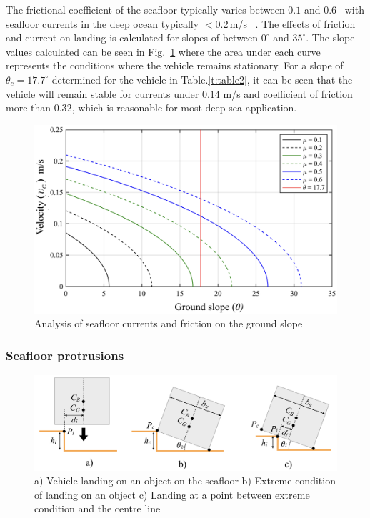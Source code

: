 \noindent The frictional coefficient of the seafloor typically varies between $0.1$ and $0.6$~\cite{DNV2017} with seafloor currents in the deep ocean typically $<0.2$\,m/s 
~\cite{Hollister1972}. The effects of friction and current on landing is calculated for slopes of between $0^\circ$ and $35^\circ$. The slope values calculated can be seen in Fig.~\ref{f:mehul10} where the area under each curve represents the conditions where the vehicle remains stationary. For a slope of $\theta_c = 17.7^\circ$ determined for the vehicle in Table.\ref{t:table2}, it can be seen that the vehicle will remain stable for currents under $0.14$ m/s and coefficient of friction more than $0.32$, which is reasonable for most deep-sea application.

\begin{figure}[!ht]
\centering
\includegraphics[width=4.5in]{./images/mehul10.png}
\caption{Analysis of seafloor currents and friction on the ground slope}
\label{f:mehul10}
\end{figure}

\subsubsection{Seafloor protrusions}

\begin{figure}[!t]
\centering
\includegraphics[width=\textwidth]{./images/mehul11.png}
\caption{a) Vehicle landing on an object on the seafloor b) Extreme condition of landing on an object c) Landing at a point between extreme condition and the centre line}
\label{f:mehul11}
\end{figure}

